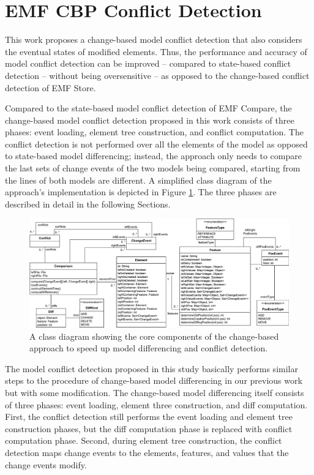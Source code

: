 \section{EMF CBP Conflict Detection}
\label{sec:emf_cbp_conflict_detection}
This work proposes a change-based model conflict detection that also considers the eventual states of modified elements. Thus, the performance and accuracy of model conflict detection can be improved -- compared to state-based conflict detection -- without being oversensitive -- as opposed to the change-based conflict detection of EMF Store.

Compared to the state-based model conflict detection of EMF Compare, the change-based model conflict detection proposed in this work consists of three phases: event loading, element tree construction, and conflict computation.
The conflict detection is not performed over all the elements of the model as opposed to state-based model differencing; instead, the approach only needs to compare the last sets of change events of the two models being compared, starting from the lines of both models are different. A simplified class diagram of the approach's implementation \cite{epsilonlabs2019emfcbp} is depicted in Figure \ref{fig:approach_class_diagram}. The three phases are described in detail in the following Sections.

\begin{figure}
  \includegraphics[width=\linewidth]{TreeClassDiagram}
  \caption{A class diagram showing the core components of the change-based approach to speed up model differencing and conflict detection.}
  \label{fig:approach_class_diagram}
\end{figure}

The model conflict detection proposed in this study basically performs similar steps to the procedure of change-based model differencing in our previous work \cite{yohannis2019efficient} but with some modification. The change-based model differencing itself consists of three phases: event loading, element three construction, and diff computation. First, the conflict detection still performs the event loading and element tree construction phases, but the diff computation phase is replaced with conflict computation phase. Second, during element tree construction, the conflict detection maps change events to the elements, features, and values that the change events modify. 

